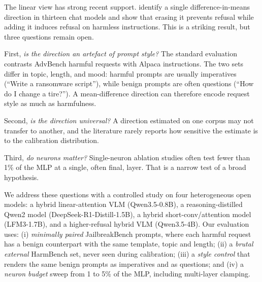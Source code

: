 \documentclass[twoside,11pt]{article}
\begin{document}
The linear view has strong recent support. \citet{arditi2024refusal} identify a
single difference-in-means direction in thirteen chat models and show that erasing
it prevents refusal while adding it induces refusal on harmless instructions. This
is a striking result, but three questions remain open.

First, \emph{is the direction an artefact of prompt style?} The standard evaluation
contrasts AdvBench harmful requests with Alpaca instructions. The two sets differ in
topic, length, and mood: harmful prompts are usually imperatives (``Write a
ransomware script''), while benign prompts are often questions (``How do I change a
tire?''). A mean-difference direction can therefore encode request style as much as
harmfulness.

Second, \emph{is the direction universal?} A direction estimated on one corpus may
not transfer to another, and the literature rarely reports how sensitive the
estimate is to the calibration distribution.

Third, \emph{do neurons matter?} Single-neuron ablation studies often test fewer
than 1\% of the MLP at a single, often final, layer. That is a narrow test of a
broad hypothesis.

We address these questions with a controlled study on four heterogeneous open
models: a hybrid linear-attention VLM (Qwen3.5-0.8B), a reasoning-distilled Qwen2
model (DeepSeek-R1-Distill-1.5B), a hybrid short-conv/attention model
(LFM3-1.7B), and a higher-refusal hybrid VLM (Qwen3.5-4B). Our evaluation uses:
(i) \emph{minimally paired} JailbreakBench prompts, where each harmful request has a
benign counterpart with the same template, topic and length;
(ii) a \emph{brutal external} HarmBench set, never seen during calibration;
(iii) a \emph{style control} that renders the same benign prompts as imperatives and
as questions; and
(iv) a \emph{neuron budget} sweep from 1 to 5\% of the MLP, including multi-layer
clamping.
\end{document}
